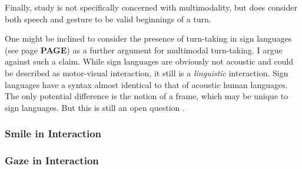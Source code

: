 Finally,  study is not specifically concerned with multimodality, but does consider both speech and gesture to be valid beginnings of a turn.

One might be inclined to consider the presence of turn-taking in sign languages (see page \textbf{PAGE}) as a further argument for multimodal turn-taking.
I argue against such a claim.
While sign languages are obviously not acoustic and could be described as motor-visual interaction, it still is a \emph{linguistic} interaction.
Sign languages have a syntax almost identical to that of acoustic human languages.
The only potential difference is the notion of a frame, which may be unique to sign languages.
But this is still an open question \citep{source}.

\subsubsection{Smile in Interaction}
\subsubsection{Gaze in Interaction}


